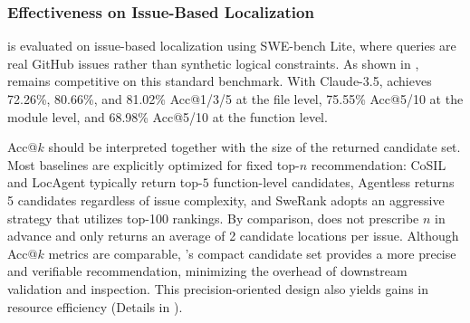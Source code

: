 \subsubsection{Effectiveness on Issue-Based Localization}

\tooldataloc is evaluated on issue-based localization using SWE-bench Lite, where queries are real GitHub issues rather than synthetic logical constraints. As shown in , \tooldataloc remains competitive on this standard benchmark. With Claude-3.5, \tooldataloc achieves 72.26\%, 80.66\%, and 81.02\% Acc@1/3/5 at the file level, 75.55\% Acc@5/10 at the module level, and 68.98\% Acc@5/10 at the function level.

Acc@$k$ should be interpreted together with the size of the returned candidate set. Most baselines are explicitly optimized for fixed top-$n$ recommendation: CoSIL and LocAgent typically return top-$5$ function-level candidates, Agentless returns 5 candidates regardless of issue complexity, and SweRank adopts an aggressive strategy that utilizes top-100 rankings. By comparison, \tooldataloc does not prescribe $n$ in advance and only returns an average of 2 candidate locations per issue. Although Acc@$k$ metrics are comparable, \tooldataloc's compact candidate set provides a more precise and verifiable recommendation, minimizing the overhead of downstream validation and inspection. This precision-oriented design also yields gains in resource efficiency (Details in ).

